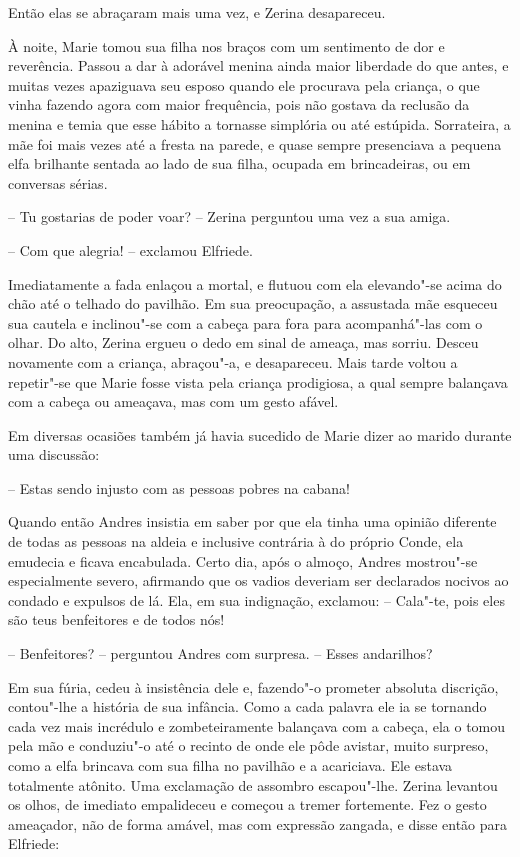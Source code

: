 Então elas se abraçaram mais uma vez, e Zerina desapareceu.

À noite, Marie tomou sua filha nos braços com um sentimento de dor e
reverência. Passou a dar à adorável menina ainda maior liberdade do que
antes, e muitas vezes apaziguava seu esposo quando ele procurava pela
criança, o que vinha fazendo agora com maior frequência, pois não
gostava da reclusão da menina e temia que esse hábito a tornasse
simplória ou até estúpida. Sorrateira, a mãe foi mais vezes até a
fresta na parede, e quase sempre presenciava a pequena elfa brilhante
sentada ao lado de sua filha, ocupada em brincadeiras, ou em conversas sérias.

-- Tu gostarias de poder voar? -- Zerina perguntou uma vez a sua amiga.

-- Com que alegria! -- exclamou Elfriede.

Imediatamente a fada enlaçou a mortal, e flutuou com ela elevando"-se
acima do chão até o telhado do pavilhão. Em sua preocupação, a
assustada mãe esqueceu sua cautela e inclinou"-se com a cabeça para fora
para acompanhá"-las com o olhar. Do alto, Zerina ergueu o dedo em sinal
de ameaça, mas sorriu. Desceu novamente com a criança, abraçou"-a, e
desapareceu. Mais tarde voltou a repetir"-se que Marie fosse vista pela
criança prodigiosa, a qual sempre balançava com a cabeça ou ameaçava,
mas com um gesto afável.

Em diversas ocasiões também já havia sucedido de Marie dizer ao marido
durante uma discussão:

-- Estas sendo injusto com as pessoas pobres na cabana!

Quando então Andres insistia em saber por que ela tinha uma opinião
diferente de todas as pessoas na aldeia e inclusive contrária à do
próprio Conde, ela emudecia e ficava encabulada. Certo dia, após o
almoço, Andres mostrou"-se especialmente severo, afirmando que os vadios
deveriam ser declarados nocivos ao condado e expulsos de lá. Ela, em
sua indignação, exclamou:
\pagebreak
-- Cala"-te, pois eles são teus benfeitores e de todos nós!

-- Benfeitores? -- perguntou Andres com surpresa. -- Esses andarilhos?

Em sua fúria, cedeu à insistência dele e, fazendo"-o prometer absoluta
discrição, contou"-lhe a história de sua infância. Como a cada palavra
ele ia se tornando cada vez mais incrédulo e zombeteiramente balançava
com a cabeça, ela o tomou pela mão e conduziu"-o até o recinto de onde
ele pôde avistar, muito surpreso, como a elfa brincava com sua filha no
pavilhão e a acariciava. Ele estava totalmente atônito. Uma exclamação
de assombro escapou"-lhe. Zerina levantou os olhos, de imediato
empalideceu e começou a tremer fortemente. Fez o gesto ameaçador, não
de forma amável, mas com expressão zangada, e disse então para Elfriede:

